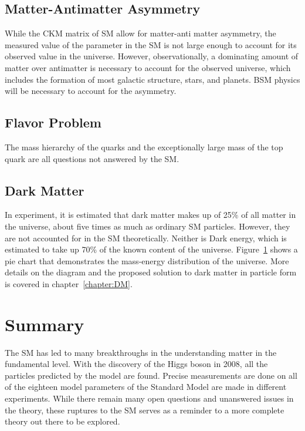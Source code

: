 \subsection{Matter-Antimatter Asymmetry}
While the CKM matrix of SM allow for matter-anti matter asymmetry, the measured value of the parameter in the SM is not large enough to account for its observed value in the universe. However, observationally, a dominating amount of matter over antimatter is necessary to account for the observed universe, which includes the formation of most galactic structure, stars, and planets. BSM physics will be necessary to account for the asymmetry. 

\subsection{Flavor Problem}
The mass hierarchy of the quarks and the exceptionally large mass of the top quark are all questions not answered by the SM.

\subsection{Dark Matter}
In experiment, it is estimated that dark matter makes up of 25\% of all matter in the universe, about five times as much as ordinary SM particles. However, they are not accounted for in the SM theoretically.
Neither is Dark energy, which is estimated to take up 70\% of the known content of the universe. Figure~\ref{} shows a pie chart that demonstrates the mass-energy distribution of the universe. More details on the diagram and the proposed solution to dark matter in particle form is covered in chapter~\ref{chapter:DM}.

\section{Summary}
The SM has led to many breakthroughs in the understanding matter in the fundamental level. With the discovery of the Higgs boson in 2008, all the particles predicted by the model are found. Precise measurements are done on all of the eighteen model parameters of the Standard Model are made in different experiments. While there remain many open questions and unanswered issues in the theory, these ruptures to the SM serves as a reminder to a more complete theory out there to be explored.


